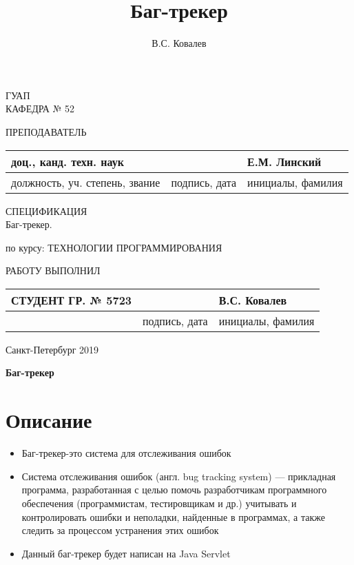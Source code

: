\documentclass[a4paper,14pt]{extarticle} %
\author{В.С. Ковалев}
\title{Баг-трекер}
\begin{document}
 
\begin{titlepage} 
\begin{center} 

ГУАП\\ 
КАФЕДРА № 52\\ 
\vspace{2cm} 

\begin{flushleft} 
ПРЕПОДАВАТЕЛЬ 
\begin{tabular}{|l|l|l|} 
\hline 
доц., канд. техн. наук & & Е.М. Линский\\ 
\hline 
должность, уч. степень, звание & подпись, дата & инициалы, фамилия\\ 
\hline 
\end{tabular} 
\end{flushleft} 

\vspace{3cm} 

{\Large СПЕЦИФИКАЦИЯ\\} 
\vspace{0.3cm} 
{\Large Баг-трекер.} 

\vspace{0.7cm} 

\begin{flushleft} 
по курсу: ТЕХНОЛОГИИ ПРОГРАММИРОВАНИЯ 
\end{flushleft} 

\vspace{5cm} 

\begin{flushleft} 
РАБОТУ ВЫПОЛНИЛ 
\begin{tabular}{|l|l|l|} 
\hline 
СТУДЕНТ ГР. № 5723 & & В.С. Ковалев\\ 
\hline 
& подпись, дата & инициалы, фамилия\\ 
\hline 
\end{tabular} 
\end{flushleft} 

\vspace{2cm} 

Санкт-Петербург 2019

\end{center} 
\end{titlepage} 
\renewcommand{\chaptername}{Раздел} 
\renewcommand{\figurename}{Рисунок} 

\begin{center} 
\huge \bf Баг-трекер
\end{center} 
\setcounter{page}{2} 
\section{Описание}
\begin{itemize}
    \item{Баг-трекер-это система для отслеживания ошибок}
    \item{Система отслеживания ошибок (англ. bug tracking system) — прикладная программа, разработанная с целью помочь разработчикам программного обеспечения (программистам, тестировщикам и др.) учитывать и контролировать ошибки и неполадки, найденные в программах, а также следить за процессом устранения этих ошибок} 
    \item{Данный баг-трекер будет написан на Java Servlet}
\end{itemize}
\end{document}
